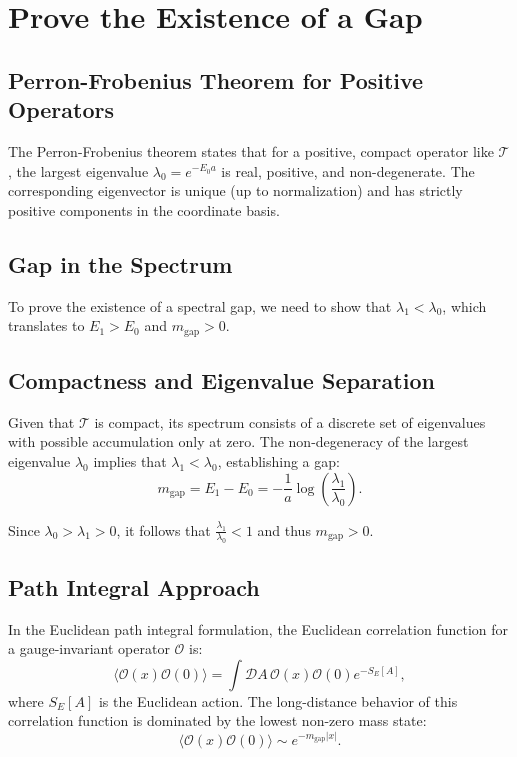\section{Prove the Existence of a Gap}

\subsection{Perron-Frobenius Theorem for Positive Operators}

The Perron-Frobenius theorem states that for a positive, compact operator like \(\mathcal{T}\), the largest eigenvalue \(\lambda_0 = e^{-E_0 a}\) is real, positive, and non-degenerate. The corresponding eigenvector is unique (up to normalization) and has strictly positive components in the coordinate basis.

\subsection{Gap in the Spectrum}

To prove the existence of a spectral gap, we need to show that \(\lambda_1 < \lambda_0\), which translates to \(E_1 > E_0\) and \(m_{\text{gap}} > 0\).

\subsection{Compactness and Eigenvalue Separation}

Given that \(\mathcal{T}\) is compact, its spectrum consists of a discrete set of eigenvalues with possible accumulation only at zero. The non-degeneracy of the largest eigenvalue \(\lambda_0\) implies that \(\lambda_1 < \lambda_0\), establishing a gap:
\begin{equation}
m_{\text{gap}} = E_1 - E_0 = -\frac{1}{a} \log\left(\frac{\lambda_1}{\lambda_0}\right).
\end{equation}

Since \(\lambda_0 > \lambda_1 > 0\), it follows that \(\frac{\lambda_1}{\lambda_0} < 1\) and thus \(m_{\text{gap}} > 0\).

\subsection{Path Integral Approach}

In the Euclidean path integral formulation, the Euclidean correlation function for a gauge-invariant operator \(\mathcal{O}\) is:
\begin{equation}
\langle \mathcal{O}(x) \mathcal{O}(0) \rangle = \int \mathcal{D}A \, \mathcal{O}(x) \mathcal{O}(0) e^{-S_E[A]},
\end{equation}
where \(S_E[A]\) is the Euclidean action. The long-distance behavior of this correlation function is dominated by the lowest non-zero mass state:
\begin{equation}
\langle \mathcal{O}(x) \mathcal{O}(0) \rangle \sim e^{-m_{\text{gap}} |x|}.
\end{equation}


